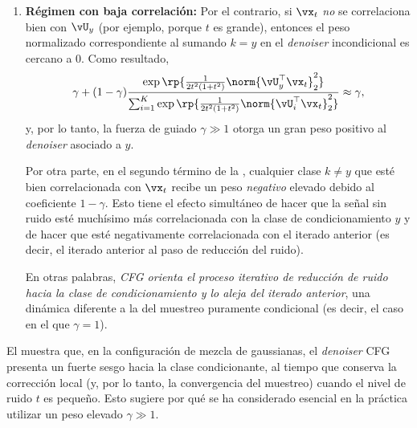 \documentclass[../../book-main_es.tex]{subfiles}
\begin{document}
\begin{example}
\begin{enumerate}
            Esto implica que: ¡\textit{si la entrada del \textit{denoiser} CFG está altamente
                correlacionada con uno de los subespacios de clase, el \textit{denoiser} es
                aproximadamente igual al \textit{denoiser} condicional de la clase
            correspondiente}! Por lo tanto, esperamos que el muestreador de reducción de ruido CFG converja.
        \item \textbf{Régimen con baja correlación:} Por el contrario, si $\vx_t$
            \textit{no} se correlaciona bien con $\vU_y$ (por ejemplo,
            porque $t$ es grande),
            entonces el peso normalizado correspondiente al sumando $k=y$ en el
            \textit{denoiser} incondicional es cercano a $0$. Como resultado,
            \begin{equation}
                \gamma + (1 - \gamma)
                \frac{\exp\rp{\frac{1}{2t^{2}(1
                + t^{2})}\norm{\vU_{y}^{\top}\vx_t}_{2}^{2}}}{\sum_{i
                    = 1}^{K}\exp\rp{\frac{1}{2t^{2}(1
                + t^{2})}\norm{\vU_{i}^{\top}\vx_t}_{2}^{2}}}
                \approx \gamma,
            \end{equation}
            y, por lo tanto, la fuerza de guiado $\gamma \gg 1$ otorga un
            gran peso positivo
            al \textit{denoiser} asociado a $y$.

            Por otra parte, en el segundo término de la
            ,
            cualquier clase $k \neq y$ que esté bien correlacionada con $\vx_t$
            recibe un peso \textit{negativo} elevado debido al coeficiente $1 - \gamma$.
            Esto tiene el efecto simultáneo de hacer que la señal sin ruido
            esté muchísimo
            más correlacionada con la clase de condicionamiento $y$ y
            de hacer que esté negativamente
            correlacionada con el iterado anterior (es decir, el iterado
            anterior al paso de reducción del ruido).

            En otras palabras, \textit{CFG orienta el proceso iterativo de reducción de ruido
                hacia la clase de condicionamiento y lo aleja del
                iterado
            anterior}, una dinámica diferente a la del muestreo puramente condicional
            (es decir, el caso en el que $\gamma = 1$).
    \end{enumerate}
\end{example}

El  muestra que, en la configuración de mezcla de
gaussianas, el \textit{denoiser} CFG presenta un fuerte sesgo hacia la
clase condicionante, al tiempo que conserva la corrección local (y, por lo tanto, la convergencia del
muestreo) cuando el nivel de ruido $t$ es pequeño.
Esto sugiere por qué se ha considerado esencial en la práctica
utilizar un peso elevado $\gamma \gg 1$.
\end{document}
